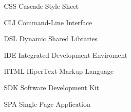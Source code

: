 \begin{siglas}
  
  \item[CSS] Cascade Style Sheet
  \item[CLI] Command-Line Interface
  \item[DSL] Dynamic Shared Libraries
  \item[IDE] Integrated Development Enviroment
  \item[HTML] HiperText Markup Language
  \item[SDK] Software Development Kit
  \item[SPA] Single Page Application
    
\end{siglas}
